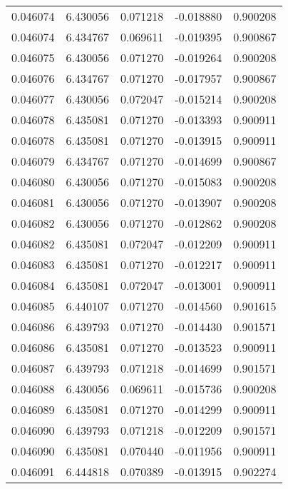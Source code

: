\begin{tabular}{lrrrr}
0.046074    &  6.430056 &  0.071218 & -0.018880 &             0.900208 \\
0.046074    &  6.434767 &  0.069611 & -0.019395 &             0.900867 \\
0.046075    &  6.430056 &  0.071270 & -0.019264 &             0.900208 \\
0.046076    &  6.434767 &  0.071270 & -0.017957 &             0.900867 \\
0.046077    &  6.430056 &  0.072047 & -0.015214 &             0.900208 \\
0.046078    &  6.435081 &  0.071270 & -0.013393 &             0.900911 \\
0.046078    &  6.435081 &  0.071270 & -0.013915 &             0.900911 \\
0.046079    &  6.434767 &  0.071270 & -0.014699 &             0.900867 \\
0.046080    &  6.430056 &  0.071270 & -0.015083 &             0.900208 \\
0.046081    &  6.430056 &  0.071270 & -0.013907 &             0.900208 \\
0.046082    &  6.430056 &  0.071270 & -0.012862 &             0.900208 \\
0.046082    &  6.435081 &  0.072047 & -0.012209 &             0.900911 \\
0.046083    &  6.435081 &  0.071270 & -0.012217 &             0.900911 \\
0.046084    &  6.435081 &  0.072047 & -0.013001 &             0.900911 \\
0.046085    &  6.440107 &  0.071270 & -0.014560 &             0.901615 \\
0.046086    &  6.439793 &  0.071270 & -0.014430 &             0.901571 \\
0.046086    &  6.435081 &  0.071270 & -0.013523 &             0.900911 \\
0.046087    &  6.439793 &  0.071218 & -0.014699 &             0.901571 \\
0.046088    &  6.430056 &  0.069611 & -0.015736 &             0.900208 \\
0.046089    &  6.435081 &  0.071270 & -0.014299 &             0.900911 \\
0.046090    &  6.439793 &  0.071218 & -0.012209 &             0.901571 \\
0.046090    &  6.435081 &  0.070440 & -0.011956 &             0.900911 \\
0.046091    &  6.444818 &  0.070389 & -0.013915 &             0.902274 \\

\end{tabular}
